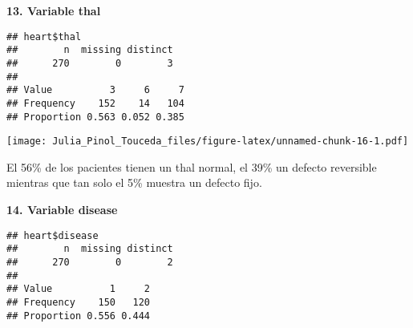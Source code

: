 \documentclass[]{article}
\newenvironment{Shaded}{\begin{snugshade}}{\end{snugshade}}
\newcommand{\KeywordTok}[1]{\textcolor[rgb]{0.13,0.29,0.53}{\textbf{#1}}}
\newcommand{\DataTypeTok}[1]{\textcolor[rgb]{0.13,0.29,0.53}{#1}}
\newcommand{\DecValTok}[1]{\textcolor[rgb]{0.00,0.00,0.81}{#1}}
\newcommand{\StringTok}[1]{\textcolor[rgb]{0.31,0.60,0.02}{#1}}
\newcommand{\OperatorTok}[1]{\textcolor[rgb]{0.81,0.36,0.00}{\textbf{#1}}}
\newcommand{\NormalTok}[1]{#1}
\begin{document}
\textbf{13. Variable thal}

\begin{Shaded}
\end{Shaded}

\begin{verbatim}
## heart$thal 
##        n  missing distinct 
##      270        0        3 
##                             
## Value          3     6     7
## Frequency    152    14   104
## Proportion 0.563 0.052 0.385
\end{verbatim}

\begin{Shaded}
\end{Shaded}

\texttt{[image: Julia\_Pinol\_Touceda\_files/figure-latex/unnamed-chunk-16-1.pdf]}

El 56\% de los pacientes tienen un thal normal, el 39\% un defecto
reversible mientras que tan solo el 5\% muestra un defecto fijo.

\textbf{14. Variable disease}

\begin{Shaded}
\end{Shaded}

\begin{verbatim}
## heart$disease 
##        n  missing distinct 
##      270        0        2 
##                       
## Value          1     2
## Frequency    150   120
## Proportion 0.556 0.444
\end{verbatim}
\end{document}
